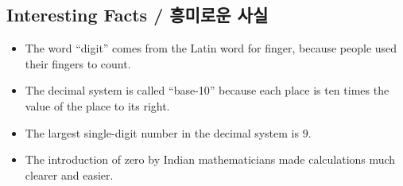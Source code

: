 \subsection*{Interesting Facts / 흥미로운 사실}

\begin{itemize}
  \item The word ``digit'' comes from the Latin word for finger, because people
        used their fingers to count.
  \item The decimal system is called ``base-10'' because each place is ten times
        the value of the place to its right.
  \item The largest single-digit number in the decimal system is \(9\).
  \item The introduction of zero by Indian mathematicians made calculations much
        clearer and easier.
\end{itemize}

